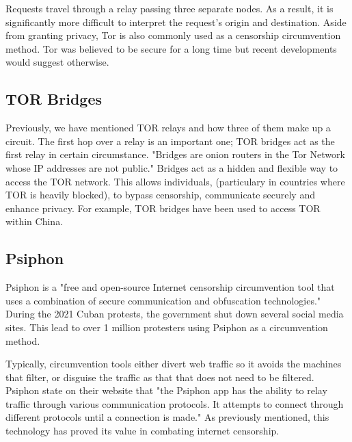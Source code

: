 Requests travel through a relay passing three separate nodes. As a result, it is significantly more difficult to interpret the request’s origin and destination. Aside from granting privacy, Tor is also commonly used as a censorship circumvention method. Tor was believed to be secure for a long time but recent developments would suggest otherwise. \cite{tor_not_secure}

\subsection{TOR Bridges}
Previously, we have mentioned TOR relays and how three of them make up a circuit. The first hop over a relay is an important one; TOR bridges act as the first relay in certain circumstance. "Bridges are onion routers in the Tor Network whose IP addresses are not public." \cite{matic2017dissecting} Bridges act as a hidden and flexible way to access the TOR network. This allows individuals, (particulary in countries where TOR is heavily blocked), to bypass censorship, communicate securely and enhance privacy. For example, TOR bridges have been used to access TOR within China. \cite{dunna2018analyzing} \cite{cyberly_tor_blocked}


\subsection{Psiphon}
Psiphon is a "free and open-source Internet censorship circumvention tool that uses a combination of secure communication and obfuscation technologies." \cite{psiphon_guide} During the 2021 Cuban protests, the government shut down several social media sites. This lead to over 1 million protesters using Psiphon as a circumvention method. \cite{bloomberg_cubans_evade_internet} 

Typically, circumvention tools either divert web traffic so it avoids the machines that filter, or disguise the traffic as that that does not need to be filtered. Psiphon state on their website that "the Psiphon app has the ability to relay traffic through various communication protocols. It attempts to connect through different protocols until a connection is made." \cite{psiphon_guide} As previously mentioned, this technology has proved its value in combating internet censorship. 
